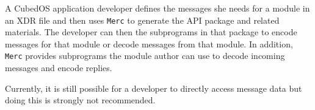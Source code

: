 A CubedOS application developer defines the messages she needs for a module in an XDR file and
then uses \texttt{Merc} to generate the API package and related materials. The developer can
then the subprograms in that package to encode messages for that module or decode messages from
that module. In addition, \texttt{Merc} provides subprograms the module author can use to decode
incoming messages and encode replies.

Currently, it is still possible for a developer to directly access message data but doing this
is strongly not recommended. 
